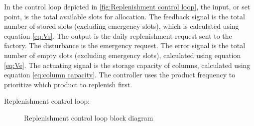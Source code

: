 In the control loop depicted in \autoref{fig:Replenishment control loop}, the input, or set point, is the total available slots for allocation. The feedback signal is the total number of stored slots (excluding emergency slots), which is calculated using equation \eqref{eq:Vs}. The output is the daily replenishment request sent to the factory. The disturbance is the emergency request. The error signal is the total number of empty slots (excluding emergency slots), calculated using equation \eqref{eq:Ve}. The actuating signal is the storage capacity of columns, calculated using equation \eqref{eq:column capacity}. The controller uses the product frequency to prioritize which product to replenish first.

    Replenishment control loop:
    \begin{figure}[!ht]
        \centering
        \caption{Replenishment control loop block diagram}
        \label{fig:Replenishment control loop}
    \end{figure}

\newpage